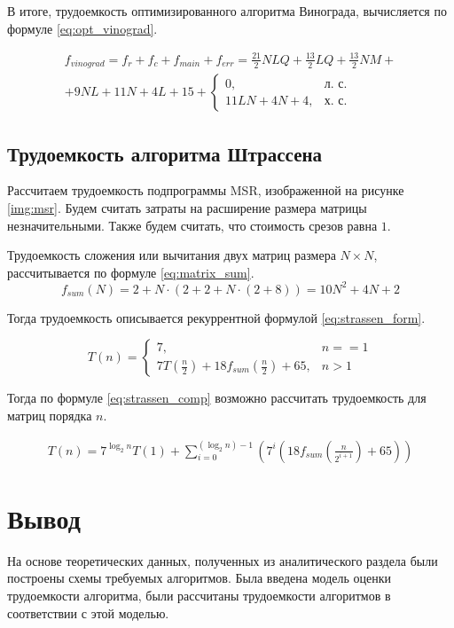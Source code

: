 В итоге, трудоемкость оптимизированного алгоритма Винограда, вычисляется по формуле \eqref{eq:opt_vinograd}.

\begin{equation}
	\label{eq:opt_vinograd}
	\begin{gathered}
		f_{vinograd} = f_{r} + f_{c} + f_{main} + f_{err} = \frac{21}{2}NLQ + \frac{13}{2}LQ + \frac{13}{2} NM + \\
		+ 9NL + 11N + 4L + 15 + 
		\begin{cases}
			0, & \text{л.~с.}\\
			11LN + 4N + 4, & \text{х.~с.}
		\end{cases}
	\end{gathered}
\end{equation}


\subsection{Трудоемкость алгоритма Штрассена}

Рассчитаем трудоемкость подпрограммы MSR, изображенной на рисунке \ref{img:msr}. Будем считать затраты на расширение размера матрицы незначительными. Также будем считать, что стоимость срезов равна $1$.

Трудоемкость сложения или вычитания двух матриц размера $N \times N$, рассчитывается по формуле \eqref{eq:matrix_sum}.
\begin{equation}
	\label{eq:matrix_sum}
	f_{sum}(N) = 2 + N \cdot (2 + 2 + N \cdot (2 + 8)) = 10N^2 + 4N + 2
\end{equation}

Тогда трудоемкость описывается рекуррентной формулой \eqref{eq:strassen_form}.

\begin{equation}
	\label{eq:strassen_form}
	T(n) = 
	\begin{cases}
		7, & n == 1\\
		7T(\frac{n}{2}) + 18f_{sum}(\frac{n}{2}) + 65, & n > 1
	\end{cases}
\end{equation}

Тогда по формуле \eqref{eq:strassen_comp} возможно рассчитать трудоемкость для матриц порядка $n$.

\begin{equation}
	\label{eq:strassen_comp}
	\begin{gathered}
		T(n) = 7^{\log_{2}{n}} T(1) + \sum_{i=0}^{(\log_{2}{n}) - 1} (7^i (18f_{sum}(\frac{n}{2 ^ {i + 1}}) + 65))
	\end{gathered}
\end{equation}


\section*{Вывод}
На основе теоретических данных, полученных из аналитического раздела были построены схемы требуемых алгоритмов. 
Была введена модель оценки трудоемкости алгоритма, были рассчитаны трудоемкости алгоритмов в соответствии с этой моделью.